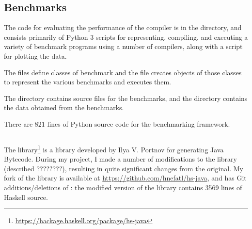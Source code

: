 \documentclass[dissertation.tex]{subfiles}
\begin{document}
{    \subsection{Benchmarks}
    {
        \begin{minipage}{0.7\textwidth}
        \vspace{-6.5cm}
        The code for evaluating the performance of the compiler is in the  directory, and consists primarily of Python 3 scripts for representing, compiling, and executing a variety of benchmark programs using a number of compilers, along with a script for plotting the data.

        The  files define classes of benchmark and the  file creates objects of those classes to represent the various benchmarks and executes them.

        The  directory contains source files for the benchmarks, and the  directory contains the data obtained from the benchmarks.

        There are 821 lines of Python source code for the benchmarking framework.
        \end{minipage}
        \hspace{5mm}
        \begin{minipage}{0.2\textwidth}
        \vspace{0pt}
        \footnotesize
        \end{minipage}
    }
    \subsection{}
    {
        \begin{minipage}{0.7\textwidth}
        \vspace{0pt}
        The  library\footnote{\url{https://hackage.haskell.org/package/hs-java}} is a library developed by Ilya V. Portnov for generating Java Bytecode. During my project, I made a number of modifications to the library (described ????????), resulting in quite significant changes from the original. My fork of the library is available at \url{https://github.com/hnefatl/hs-java}, and has Git additions/deletions of : the modified version of the library contains 3569 lines of Haskell source.


\end{minipage}}}
\end{document}
